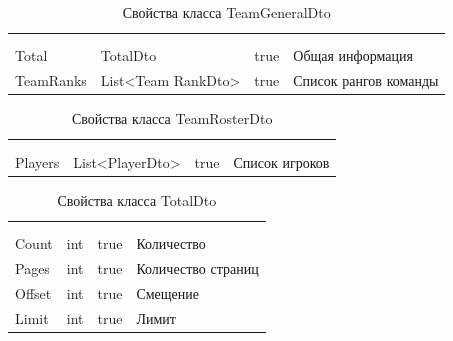 \begin{xltabular}{\textwidth}{|X|X|c|X|}
	\caption{Свойства класса TeamGeneralDto}\label{table:TeamGeneralDto}\\ \hline
	 &  &  &  \\ \hline
	 &  &  &  \\ \hline
	\endfirsthead
	 \hline
	 &  &  &  \\ \hline
	\endhead
	Total & TotalDto & true & Общая информация \\ \hline
	TeamRanks & List<Team
	RankDto> & true & Список рангов команды \\ \hline
\end{xltabular}

\begin{xltabular}{\textwidth}{|X|X|X|X|}
	\caption{Свойства класса TeamRosterDto}\label{table:TeamRosterDto}\\ \hline
	 &  &  &  \\ \hline
	 &  &  &  \\ \hline
	\endfirsthead
	 \hline
	 &  &  &  \\ \hline
	\endhead
	Players & List<PlayerDto> & true & Список игроков \\ \hline
\end{xltabular}

\begin{xltabular}{\textwidth}{|X|X|X|X|}
	\caption{Свойства класса TotalDto}\label{table:TotalDto}\\ \hline
	 &  &  &  \\ \hline
	 &  &  &  \\ \hline
	\endfirsthead
	 \hline
	 &  &  &  \\ \hline
	\endhead
	Count & int & true & Количество \\ \hline
	Pages & int & true & Количество страниц \\ \hline
	Offset & int & true & Смещение \\ \hline
	Limit & int & true & Лимит \\ \hline
\end{xltabular}

